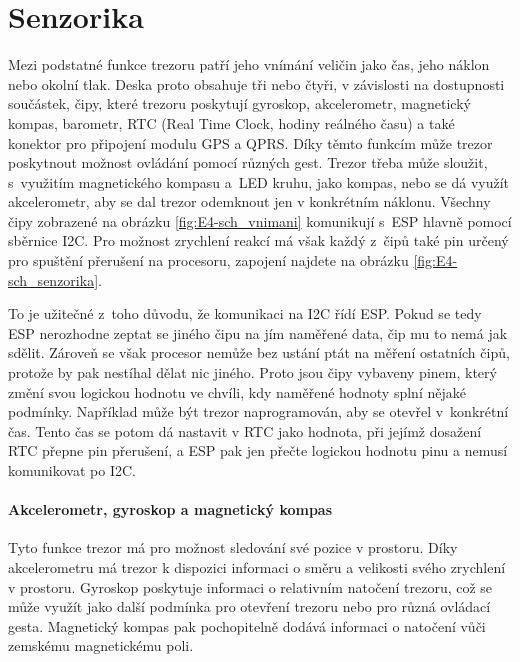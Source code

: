 \section{Senzorika}
Mezi podstatné funkce trezoru patří jeho vnímání veličin jako čas, jeho náklon nebo okolní tlak.
Deska proto obsahuje tři nebo čtyři, v závislosti na dostupnosti součástek, čipy, které trezoru poskytují gyroskop, akcelerometr, magnetický kompas,
barometr, RTC (Real Time Clock, hodiny reálného času) a také konektor pro připojení modulu GPS a QPRS. Díky těmto funkcím může trezor poskytnout možnost ovládání pomocí různých gest. 
Trezor třeba může sloužit, s~využitím magnetického kompasu a~LED kruhu, jako kompas, nebo se dá využít akcelerometr, 
aby se dal trezor odemknout jen v konkrétním náklonu. Všechny čipy zobrazené na obrázku \ref{fig:E4-sch_vnimani} komunikují s~ESP hlavně pomocí 
sběrnice I2C. Pro možnost zrychlení reakcí má však každý z~čipů také pin určený pro spuštění přerušení na procesoru, zapojení najdete na obrázku \ref{fig:E4-sch_senzorika}. 

\newpage

To je užitečné z~toho důvodu, že komunikaci na I2C řídí ESP. Pokud se tedy ESP nerozhodne zeptat se jiného čipu na jím naměřené data, čip mu to nemá 
jak sdělit. Zároveň se však procesor nemůže bez ustání ptát na měření ostatních čipů, protože by pak nestíhal dělat nic jiného. Proto jsou čipy vybaveny 
pinem, který změní svou logickou hodnotu ve chvíli, kdy naměřené hodnoty splní nějaké podmínky. 
Například může být trezor naprogramován, aby se otevřel 
v~konkrétní čas. Tento čas se potom dá nastavit v RTC jako hodnota, při jejímž dosažení RTC přepne pin přerušení, a ESP pak jen přečte logickou hodnotu 
pinu a nemusí komunikovat po I2C. %

\paragraph{Akcelerometr, gyroskop a magnetický kompas}
Tyto funkce trezor má pro možnost sledování své pozice v prostoru. 
Díky akcelerometru má trezor k dispozici informaci o směru a velikosti svého zrychlení v prostoru.
Gyroskop poskytuje informaci o relativním natočení trezoru, což se může využít jako další podmínka pro otevření trezoru nebo pro různá ovládací gesta.
Magnetický kompas pak pochopitelně dodává informaci o natočení vůči zemskému magnetickému poli.

